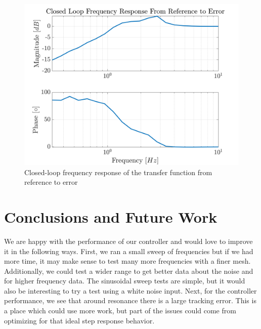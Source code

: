 \documentclass[11pt]{article}
\begin{document}
\begin{figure}[!ht]
\centering
\includegraphics[width=\textwidth]{CLFreqRespError.png}
\caption{Closed-loop frequency response of the transfer function from reference to error}
\label{fig:CLFreqResponseError}
\end{figure}



\section{Conclusions and Future Work}
We are happy with the performance of our controller and would love to improve it in the following ways. First, we ran a small sweep of frequencies but if we had more time, it may make sense to test many more frequencies with a finer mesh. Additionally, we could test a wider range to get better data about the noise and for higher frequency data. The sinusoidal sweep tests are simple, but it would also be interesting to try a test using a white noise input. 
Next, for the controller performance, we see that around resonance there is a large tracking error. This is a place which could use more work, but part of the issues could come from optimizing for that ideal step response behavior. 

\begin{thebibliography}{9}
\end{thebibliography}
\end{document}
